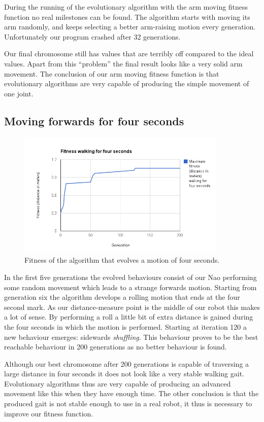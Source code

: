 \documentclass[a4paper,10pt]{article}
\begin{document}
During the running of the evolutionary algorithm with the arm moving fitness function no real milestones can be found. The algorithm starts with moving its arm randomly, and keeps selecting a better arm-raising motion every generation. Unfortunately our program crashed after 32 generations. 

Our final chromosome still has values that are terribly off compared to the ideal values. Apart from this “problem” the final result looks like a very solid arm movement. The conclusion of our arm moving fitness function is that evolutionary algorithms are very capable of producing the simple movement of one joint.

\subsection{Moving forwards for four seconds}
\label{sec:resultsJGapForwardsMoving}
\begin{figure}[h!]
\includegraphics[width=100mm]{images/walking}
\caption{Fitness of the algorithm that evolves a motion of four seconds.}
\label{fig:walkingFitness}
\end{figure}

In the first five generations the evolved behaviours consist of our Nao performing some random movement which leads to a strange forwards motion. Starting from generation six the algorithm develops a rolling motion that ends at the four second mark. As our distance-measure point is the middle of our robot this makes a lot of sense. By performing a roll a little bit of extra distance is gained during the four seconds in which the motion is performed. Starting at iteration 120 a new behaviour emerges: sidewards \emph{shuffling}. This behaviour proves to be the best reachable behaviour in 200 generations as no better behaviour is found. 

Although our best chromosome after 200 generations is capable of traversing a large distance in four seconds it does not look like a very stable walking gait. Evolutionary algorithms thus are very capable of producing an advanced movement like this when they have enough time. The other conclusion is that the produced gait is not stable enough to use in a real robot, it thus is necessary to improve our fitness function. 
\end{document}
